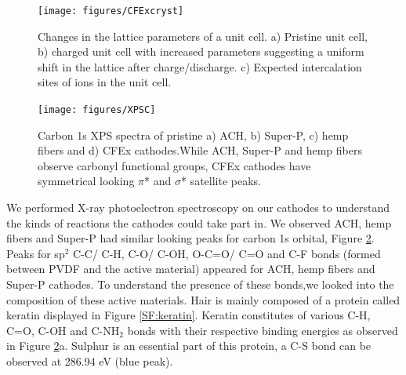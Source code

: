 \begin{figure}[tbh!]
  \centering
  \texttt{[image: figures/CFExcryst]}
    \caption{Changes in the lattice parameters of a  unit cell. a) Pristine unit cell, b) charged unit cell with increased parameters suggesting a uniform shift in the lattice after charge/discharge. c) Expected intercalation sites of  ions in the unit cell.}
  \label{figures:CFExcryst}
\end{figure}
\begin{figure}[tbh!]
  \centering
  \texttt{[image: figures/XPSC]}
    \caption{Carbon 1s XPS spectra of pristine a) ACH, b) Super-P, c) hemp fibers and d) CFEx cathodes.While ACH, Super-P and hemp fibers observe carbonyl functional groups, CFEx cathodes have symmetrical looking $\pi$* and $\sigma$* satellite peaks.}
  \label{figures:XPSC}
\end{figure}
We performed X-ray photoelectron spectroscopy on our cathodes to understand the kinds of reactions the cathodes could take part in. We observed ACH, hemp fibers and Super-P had similar looking peaks for carbon 1s orbital, Figure \ref{figures:XPSC}. Peaks for sp$^2$ C-C/ C-H, C-O/ C-OH, O-C=O/ C=O and C-F bonds (formed between PVDF and the active material) appeared for ACH, hemp fibers and Super-P cathodes. To understand the presence of these bonds,we looked into the composition of these active materials. Hair is mainly composed of a protein called keratin displayed in Figure \ref{SF:keratin}. Keratin constitutes of various C-H, C=O, C-OH and C-NH$_2$ bonds with their respective binding energies as observed in Figure \ref{figures:XPSC}a. Sulphur is an essential part of this protein, a C-S bond can be observed at 286.94 eV (blue peak). 
